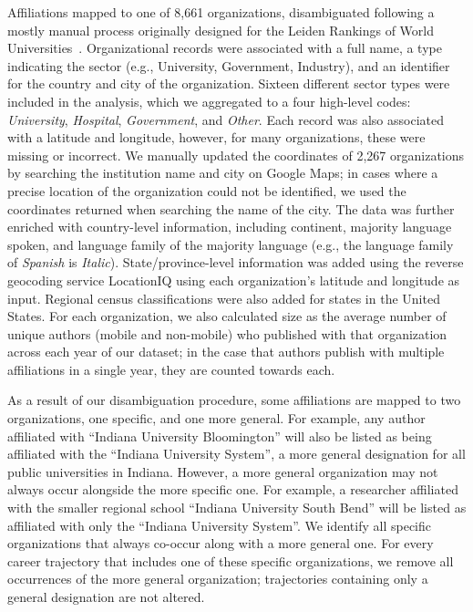 \documentclass[12pt]{article} %
\begin{document}
Affiliations mapped to one of 8,661 organizations, disambiguated following a mostly manual process originally designed for the Leiden Rankings of World Universities~\cite{waltman2012leidenrankings}. 
Organizational records were associated with a full name, a type indicating the sector (e.g., University, Government, Industry), and an identifier for the country and city of the organization. 
Sixteen different sector types were included in the analysis, which we aggregated to a four high-level codes: \textit{University}, \textit{Hospital}, \textit{Government}, and \textit{Other}. 
Each record was also associated with a latitude and longitude, however, for many organizations, these were missing or incorrect. We manually updated the coordinates of 2,267 organizations by searching the institution name and city on Google Maps;
in cases where a precise location of the organization could not be identified, we used the coordinates returned when searching the name of the city.
The data was further enriched with country-level information, including continent, majority language spoken, and language family of the majority language (e.g., the language family of \textit{Spanish} is \textit{Italic}).  
State/province-level information was added using the reverse geocoding service LocationIQ using each organization's latitude and longitude as input. 
Regional census classifications were also added for states in the United States.
For each organization, we also calculated size as the average number of unique authors (mobile and non-mobile) who published with that organization across each year of our dataset;
in the case that authors publish with multiple affiliations in a single year, they are counted towards each. 

As a result of our disambiguation procedure, some affiliations are mapped to two organizations, one specific, and one more general.
For example, any author affiliated with ``Indiana University Bloomington'' will also be listed as being affiliated with the ``Indiana University System'', a more general designation for all public universities in Indiana. 
However, a more general organization may not always occur alongside the more specific one.
For example, a researcher affiliated with the smaller regional school ``Indiana University South Bend'' will be listed as affiliated with only the ``Indiana University System''. 
We identify all specific organizations that always co-occur along with a more general one.
For every career trajectory that includes one of these specific organizations, we remove all occurrences of the more general organization;
trajectories containing only a general designation are not altered. 
\end{document}
